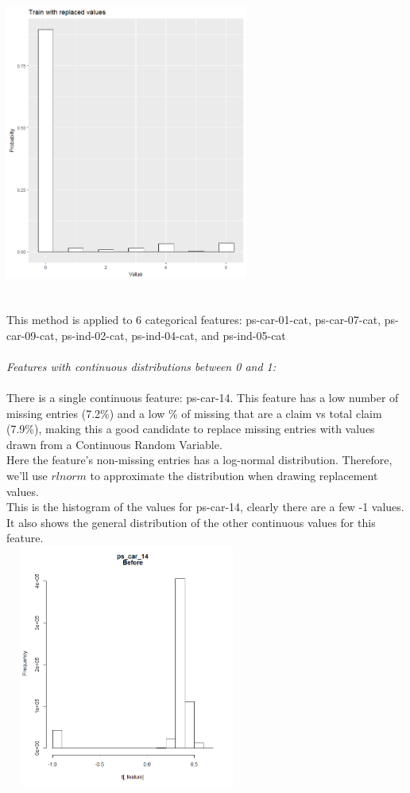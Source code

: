 \documentclass[fleqn,10pt]{SelfArx} %
\begin{document}
\includegraphics[width=8cm, height=10cm]{ex_finished} \\
\\ This method is applied to 6 categorical features: ps-car-01-cat, ps-car-07-cat, ps-car-09-cat, ps-ind-02-cat, ps-ind-04-cat, and ps-ind-05-cat \\
\\
\textit{Features with continuous distributions between 0 and 1:}\\
\\
There is a single continuous feature: ps-car-14. This feature has a low number of missing entries (7.2\%) and a low \% of missing that are a claim vs total claim (7.9\%), making this a good candidate to replace missing entries with values drawn from a Continuous Random Variable.\\
Here the feature's non-missing entries has a log-normal distribution. Therefore, we'll use $rlnorm$ to approximate the distribution when drawing replacement values.\\
\newpage
This is the histogram of the values for ps-car-14, clearly there are a few -1 values. It also shows the general distribution of the other continuous values for this feature.\\ 
\includegraphics[width=8cm, height=8cm]{cont-before} \\
\end{document}
